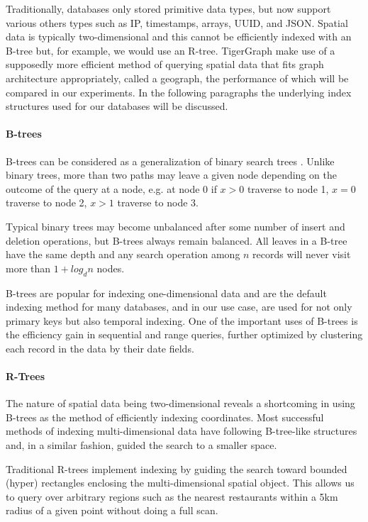 Traditionally, databases only stored primitive data types, but now support various others types such as IP, timestamps, arrays, UUID, and JSON. Spatial data is typically two-dimensional and this cannot be efficiently indexed with an B-tree but, for example, we would use an R-tree. TigerGraph make use of a supposedly more efficient method of querying spatial data that fits graph architecture appropriately, called a geograph, the performance of which will be compared in our experiments. In the following paragraphs the underlying index structures used for our databases will be discussed.

\paragraph{B-trees}
B-trees can be considered as a generalization of binary search trees \cite{btree}. Unlike binary trees, more than two paths may leave a given node depending on the outcome of the query at a node, e.g. at node 0 if $x>0$ traverse to node 1, $x=0$ traverse to node 2, $x>1$ traverse to node 3.

Typical binary trees may become unbalanced after some number of insert and deletion operations, but B-trees always remain balanced. All leaves in a B-tree have the same depth and any search operation among $n$ records will never visit more than $1 + log_dn$ nodes.

B-trees are popular for indexing one-dimensional data and are the default indexing method for many databases, and in our use case, are used for not only primary keys but also temporal indexing. One of the important uses of B-trees is the efficiency gain in sequential and range queries, further optimized by clustering each record in the data by their date fields.

\paragraph{R-Trees}

The nature of spatial data being two-dimensional reveals a shortcoming in using B-trees as the method of efficiently indexing coordinates. Most successful methods of indexing multi-dimensional data have following B-tree-like structures \cite{rtree} and, in a similar fashion, guided the search to a smaller space.

Traditional R-trees implement indexing by guiding the search toward bounded (hyper) rectangles enclosing the multi-dimensional spatial object. This allows us to query over arbitrary regions such as the nearest restaurants within a 5km radius of a given point without doing a full scan.

